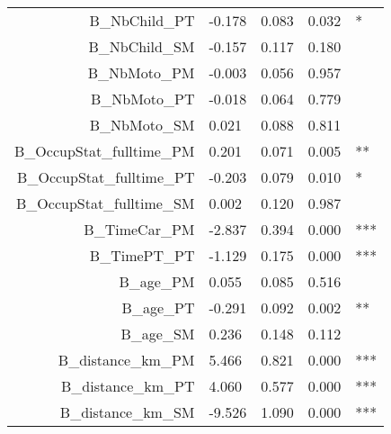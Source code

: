 \begin{table}
\begin{tabular}{rllll}
B\_NbChild\_PT             & -0.178 &    0.083 &    0.032 &            * \\
B\_NbChild\_SM             & -0.157 &    0.117 &    0.180 &              \\
B\_NbMoto\_PM              & -0.003 &    0.056 &    0.957 &              \\
B\_NbMoto\_PT              & -0.018 &    0.064 &    0.779 &              \\
B\_NbMoto\_SM              &  0.021 &    0.088 &    0.811 &              \\
B\_OccupStat\_fulltime\_PM &  0.201 &    0.071 &    0.005 &           ** \\
B\_OccupStat\_fulltime\_PT & -0.203 &    0.079 &    0.010 &            * \\
B\_OccupStat\_fulltime\_SM &  0.002 &    0.120 &    0.987 &              \\
B\_TimeCar\_PM             & -2.837 &    0.394 &    0.000 &          *** \\
B\_TimePT\_PT              & -1.129 &    0.175 &    0.000 &          *** \\
B\_age\_PM                 &  0.055 &    0.085 &    0.516 &              \\
B\_age\_PT                 & -0.291 &    0.092 &    0.002 &           ** \\
B\_age\_SM                 &  0.236 &    0.148 &    0.112 &              \\
B\_distance\_km\_PM        &  5.466 &    0.821 &    0.000 &          *** \\
B\_distance\_km\_PT        &  4.060 &    0.577 &    0.000 &          *** \\
B\_distance\_km\_SM        & -9.526 &    1.090 &    0.000 &          *** \\
\bottomrule
\end{tabular}
\end{table}

